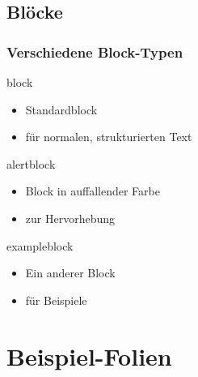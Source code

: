 \documentclass[9pt]{beamer}
\begin{document}
\subsection{Blöcke}
\begin{frame}
    \frametitle{Verschiedene Block-Typen}
    \begin{block}{block}
        \begin{itemize}
            \item Standardblock
            \item für normalen, strukturierten Text
        \end{itemize}
    \end{block}
    \begin{alertblock}{alertblock}
        \begin{itemize}
            \item Block in auffallender Farbe
			\item zur Hervorhebung
        \end{itemize}
    \end{alertblock}
    \begin{exampleblock}{exampleblock}
        \begin{itemize}
            \item Ein anderer Block
			\item für Beispiele
        \end{itemize}
    \end{exampleblock}
\end{frame}

\section{Beispiel-Folien}
\end{document}
